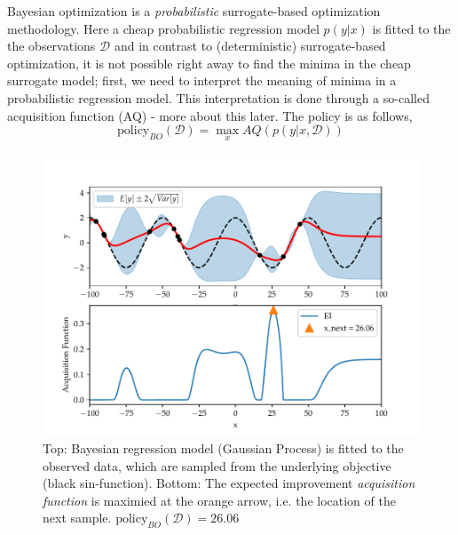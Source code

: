 
\begin{testexample}
    Bayesian optimization is a \textit{probabilistic} surrogate-based optimization
    methodology. Here a cheap probabilistic regression model $p(y|x)$ is fitted to the
    the observations $\mathcal{D}$ and in contrast to (deterministic) surrogate-based
    optimization, it is not possible right away to find the minima in the cheap
    surrogate model; first, we need to interpret the meaning of minima in a probabilistic
    regression model. This interpretation is done through a so-called acquisition
    function (AQ) - more about this later. The policy is as follows,
    $$\text{policy}_{BO}(\mathcal{D}) = \max_x AQ(p(y|x,\mathcal{D}))$$

    \begin{figure}[H]
        \begin{minipage}[c]{0.67\textwidth}
          \includegraphics[width=\textwidth]{Pictures/BO_example.pdf}
        \end{minipage}\hfill
        \begin{minipage}[c]{0.3\textwidth}
          \caption{Top: Bayesian regression model (Gaussian Process) is fitted to the observed data,
          which are sampled from the underlying objective (black sin-function). Bottom: The expected improvement
          \textit{acquisition function} is maximied at the orange arrow, i.e. the location of the
          next sample.  $\text{policy}_{BO}(\mathcal{D}) = 26.06$} \label{BO_example}
        \end{minipage}
    \end{figure}
\end{testexample}


